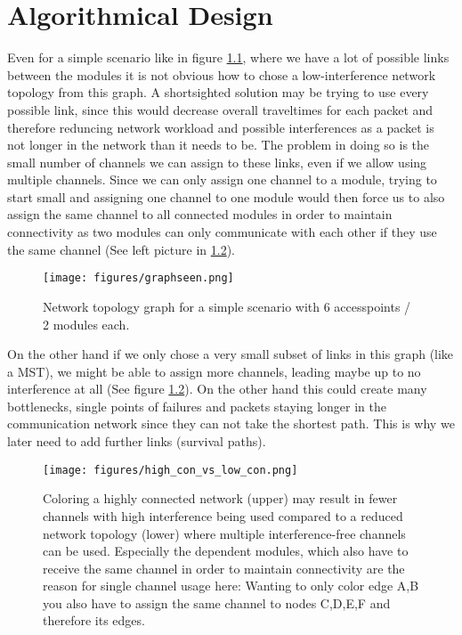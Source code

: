 \chapter{Algorithmical Design}
  Even for a simple scenario like in figure \ref{fig:graphseen}, where we have a lot of possible links between the modules it is not obvious how to
  chose a low-interference network topology from this graph.
  A shortsighted solution may be trying to use every possible link, since this would decrease overall traveltimes for each packet and therefore
  reduncing network workload and possible interferences as a packet is not longer in the network than it needs to be. 
  The problem in doing so is the small number of channels we can assign to these links, even if we allow using multiple channels.
  Since we can only assign one channel to a module, trying to start small and assigning one channel to one module would then force us to also 
  assign the same channel to all connected modules in order to maintain connectivity as two modules can only communicate with each other if they use the same channel
  (See left picture in \ref{fig:high_con_vs_low_con}). 
  
  \begin{figure}[h!]
    \centering
    \texttt{[image: figures/graphseen.png]}
    \caption{Network topology graph for a simple scenario with 6 accesspoints / 2 modules each.}
    \label{fig:graphseen}
  \end{figure}

  On the other hand if we only chose a very small subset of links in this graph (like a MST), we might be able to 
  assign more channels, leading maybe up to no interference at all (See figure \ref{fig:high_con_vs_low_con}).
  On the other hand this could create many bottlenecks, single points of failures and packets staying longer in the 
  communication network since they can not take the shortest path. This is why we later need to add further links (survival paths).

  \begin{figure}[h!]
    \centering
    \texttt{[image: figures/high\_con\_vs\_low\_con.png]}
    \caption{Coloring a highly connected network (upper) may result in fewer channels with high interference being used compared to 
      a reduced network topology (lower) where multiple interference-free channels can be used. Especially the dependent modules, which also have to receive the same channel
      in order to maintain connectivity are the reason for single channel usage here: Wanting to only color edge A,B you also have to assign the same channel to nodes C,D,E,F
      and therefore its edges.}
    \label{fig:high_con_vs_low_con}
  \end{figure}
  
